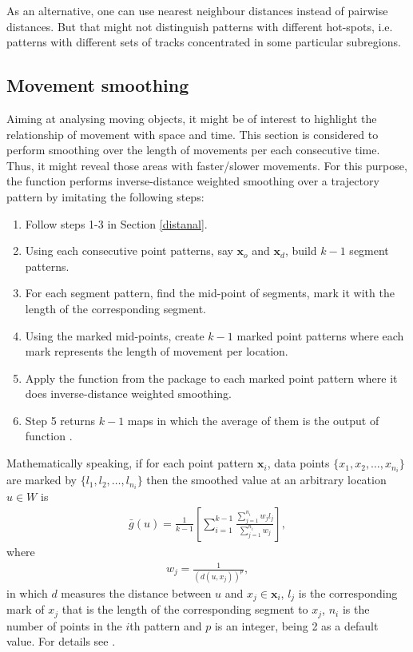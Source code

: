 \documentclass[article]{jss}
\begin{document}
As an alternative, one can use nearest neighbour distances instead of pairwise distances. But that might not distinguish patterns with different hot-spots, i.e. patterns with different sets of tracks concentrated in some particular subregions. 
  \subsection{Movement smoothing}
  Aiming at analysing moving objects, it might be of interest to highlight the relationship of movement with  space and time. This section is considered to perform smoothing over the length of movements per each consecutive time. Thus, it might reveal those areas with faster/slower movements. For this purpose, the function  performs inverse-distance weighted smoothing over a trajectory pattern by imitating the following steps:
  \begin{leftbar}
  \begin{enumerate}
  \item Follow steps 1-3 in Section \ref{distanal}.
  \item Using each consecutive point patterns, say $\mathbf{x}_o$ and $\mathbf{x}_d$, build $k-1$ segment patterns.
  \item For each segment pattern, find the mid-point of segments, mark it with the length of the corresponding segment.
  \item Using the marked mid-points, create $k-1$ marked point patterns where each mark represents the length of movement per location.
  \item Apply the function  from the package  \citep{BRT15} to each marked point pattern where it does inverse-distance weighted smoothing. 
  \item Step 5 returns $k-1$ maps in which the average of them is the output of function .
  \end{enumerate}
  \end{leftbar}
  Mathematically speaking, if for each point pattern $\mathbf{x}_i$, data points $\{ x_1,x_2,\ldots,x_{n_i} \}$ are marked by $\{ l_1,l_2,\ldots,l_{n_i} \}$ then the smoothed value at an arbitrary location $u\in W$ is
  \begin{eqnarray}
  \bar{g}(u)=\frac{1}{k-1} \left[ \sum\limits_{i=1}^{k-1} \frac{\sum\limits_{j=1}^{n_i}w_j l_j}{\sum\limits_{j=1}^{n_i} w_j} \right],
  \end{eqnarray}
  where 
  \begin{eqnarray}
  w_j=\frac{1}{(d(u,x_j))^p},
  \end{eqnarray}
  in which $d$ measures the distance between $u$ and $x_j \in \mathbf{x}_i$, $l_j$ is the corresponding mark of $x_j$ that is the length of the corresponding segment to $x_j$, $n_i$ is the number of points in the $i$th pattern and $p$ is an integer, being 2 as a default value. For details see \cite[Chapter 15]{BRT15}.
  
\end{document}
